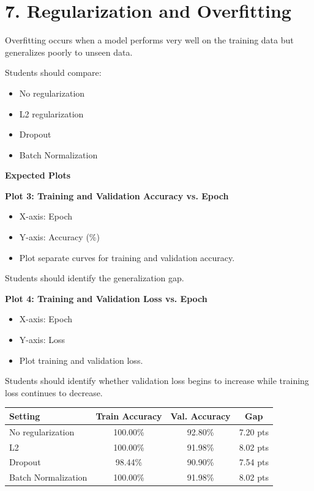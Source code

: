 \documentclass[10pt]{article}
\begin{document}
\section*{7. Regularization and Overfitting}

Overfitting occurs when a model performs very well on the training data but
generalizes poorly to unseen data.

Students should compare:

\begin{itemize}
\item No regularization
\item L2 regularization
\item Dropout
\item Batch Normalization
\end{itemize}

\textbf{Expected Plots}

\textbf{Plot 3: Training and Validation Accuracy vs. Epoch}
\begin{itemize}
\item X-axis: Epoch
\item Y-axis: Accuracy (\%)
\item Plot separate curves for training and validation accuracy.
\end{itemize}

Students should identify the generalization gap.

\textbf{Plot 4: Training and Validation Loss vs. Epoch}
\begin{itemize}
\item X-axis: Epoch
\item Y-axis: Loss
\item Plot training and validation loss.
\end{itemize}

Students should identify whether validation loss begins to increase while
training loss continues to decrease.

\begin{center}
\begin{tabular}{|l|c|c|c|}
\hline
Setting & Train Accuracy & Val. Accuracy & Gap\\
\hline
No regularization & 100.00\% & 92.80\% & 7.20 pts\\
L2 & 100.00\% & 91.98\% & 8.02 pts\\
Dropout & 98.44\% & 90.90\% & 7.54 pts\\
Batch Normalization & 100.00\% & 91.98\% & 8.02 pts\\
\hline
\end{tabular}
\end{center}
\end{document}
